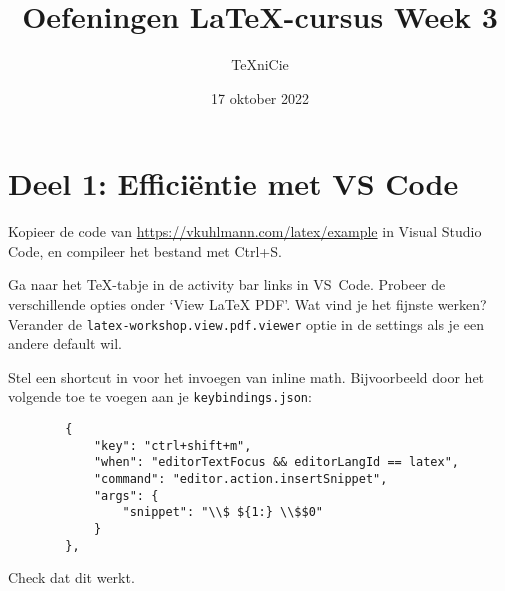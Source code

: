 \documentclass[a4paper]{article}
\title{\vspace{-65pt} Oefeningen \LaTeX-cursus Week 3}
\author{\TeX niCie%
}
\date{17 oktober 2022}
\begin{document}
\maketitle


\section{Deel 1: Effici\"entie met VS Code}

\begin{exercise}[Compilatie]
    Kopieer de code van \url{https://vkuhlmann.com/latex/example} in Visual Studio Code,
    en compileer het bestand met Ctrl+S.
\end{exercise}

\begin{exercise}
    Ga naar het TeX-tabje in de activity bar links in VS~Code. Probeer de verschillende opties
    onder `View LaTeX PDF'. Wat vind je het fijnste werken?
    Verander de \texttt{latex-workshop.view.pdf.viewer} optie in de settings als je
    een andere default wil.
\end{exercise}

\begin{exercise}
    Stel een shortcut in voor het invoegen van inline math. Bijvoorbeeld door
    het volgende toe te voegen aan je \texttt{keybindings.json}:
    \begin{verbatim}
        {
            "key": "ctrl+shift+m",
            "when": "editorTextFocus && editorLangId == latex",
            "command": "editor.action.insertSnippet",
            "args": {
                "snippet": "\\$ ${1:} \\$$0"
            }
        },
    \end{verbatim}
    Check dat dit werkt.
\end{exercise}

\end{document}
